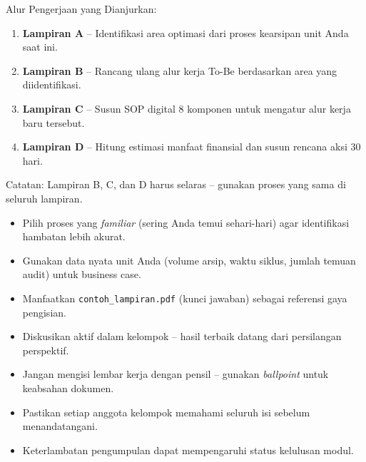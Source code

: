 \documentclass[12pt,a4paper]{report}
\begin{document}
\vspace{0.4cm}

\begin{wsinstruksibox}
Alur Pengerjaan yang Dianjurkan:
\begin{enumerate}
    \item \textbf{Lampiran A} -- Identifikasi area optimasi dari proses kearsipan unit Anda saat ini.
    \item \textbf{Lampiran B} -- Rancang ulang alur kerja To-Be berdasarkan area yang diidentifikasi.
    \item \textbf{Lampiran C} -- Susun SOP digital 8 komponen untuk mengatur alur kerja baru tersebut.
    \item \textbf{Lampiran D} -- Hitung estimasi manfaat finansial dan susun rencana aksi 30 hari.
\end{enumerate}
Catatan: Lampiran B, C, dan D harus selaras -- gunakan proses yang sama di seluruh lampiran.
\end{wsinstruksibox}

\vspace{0.3cm}

\begin{wstipbox}
\begin{itemize}
    \item Pilih proses yang \textit{ familiar} (sering Anda temui sehari-hari) agar identifikasi hambatan lebih akurat.
    \item Gunakan data nyata unit Anda (volume arsip, waktu siklus, jumlah temuan audit) untuk business case.
    \item Manfaatkan \texttt{contoh\_lampiran.pdf} (kunci jawaban) sebagai referensi gaya pengisian.
    \item Diskusikan aktif dalam kelompok -- hasil terbaik datang dari persilangan perspektif.
\end{itemize}
\end{wstipbox}

\vspace{0.3cm}

\begin{wswarnbox}
\begin{itemize}
    \item Jangan mengisi lembar kerja dengan pensil -- gunakan \textit{ballpoint} untuk keabsahan dokumen.
    \item Pastikan setiap anggota kelompok memahami seluruh isi sebelum menandatangani.
    \item Keterlambatan pengumpulan dapat mempengaruhi status kelulusan modul.
\end{itemize}
\end{wswarnbox}
\end{document}
